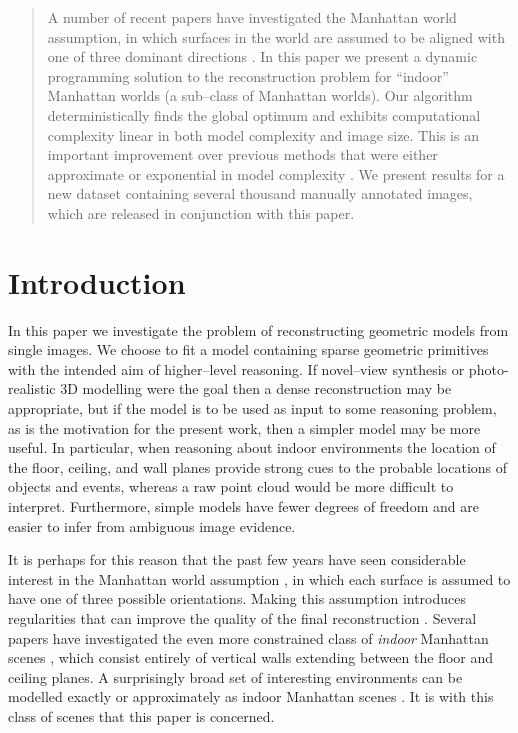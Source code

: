 \newcommand\Model{\mathcal{M}}
\newcommand\eqnref[1]{\eqref{eq:#1}}
\newcommand\Hcf{H_{c \rightarrow f}}
\newcommand\Hcfhat{\hat{H}_{c \rightarrow f}}

\begin{abstract}
A number of recent papers have investigated the Manhattan world
assumption, in which surfaces in the world are assumed to be aligned
with one of three dominant directions
\cite{Coughlan99,Zhang02,Furukawa09,Lee09}. In this paper we present a
dynamic programming solution to the reconstruction problem for
``indoor'' Manhattan worlds (a sub--class of Manhattan worlds). Our
algorithm deterministically finds the global optimum and exhibits
computational complexity linear in both model complexity and image
size. This is an important improvement over previous methods that were
either approximate \cite{Furukawa09} or exponential in model
complexity \cite{Lee09}. We present results for a new dataset
containing several thousand manually annotated images, which are
released in conjunction with this paper.
\end{abstract}

\section{Introduction}

In this paper we investigate the problem of reconstructing geometric
models from single images. We choose to fit a model containing sparse
geometric primitives with the intended aim of higher--level
reasoning. If novel--view synthesis or photo-realistic 3D modelling
were the goal then a dense reconstruction may be appropriate, but if
the model is to be used as input to some reasoning problem, as is the
motivation for the present work, then a simpler model may be more
useful. In particular, when reasoning about indoor environments the
location of the floor, ceiling, and wall planes provide strong cues to
the probable locations of objects and events, whereas a raw point
cloud would be more difficult to interpret. Furthermore, simple models
have fewer degrees of freedom and are easier to infer from ambiguous
image evidence.

It is perhaps for this reason that the past few years have seen
considerable interest in the Manhattan world assumption
\cite{Coughlan99,Zhang02,Lee09,Furukawa09,Flint10}, in which each
surface is assumed to have one of three possible orientations. Making
this assumption introduces regularities that can improve the quality
of the final reconstruction \cite{Furukawa09}. Several papers have
investigated the even more constrained class of \textit{indoor}
Manhattan scenes \cite{Lee09,Flint10,Hedau09}, which consist entirely of
vertical walls extending between the floor and ceiling planes. A
surprisingly broad set of interesting environments can be modelled
exactly or approximately as indoor Manhattan scenes \cite{Flint10}. It
is with this class of scenes that this paper is concerned.

